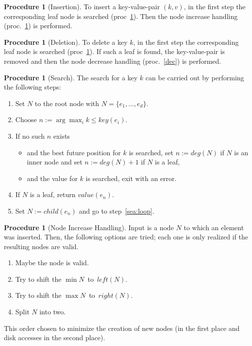 \documentclass[a4paper, 8pt]{scrartcl}
\theoremstyle{plain}
\theoremstyle{definition}
\newtheorem{proc}[thm]{Procedure}
\theoremstyle{remark}
\begin{document}
\begin{multicols}{2}
\begin{proc}[Insertion] \label{ins}
To insert a key-value-pair \mbox{$(k, v)$}, in the first step the corresponding
leaf node is searched (proc~\ref{sea}).
Then the node increase handling (proc.~\ref{inc}) is performed.
\end{proc}


\begin{proc}[Deletion] \label{del}
To delete a key $k$, in the first step the corresponding
leaf node is searched (proc~\ref{sea}).
If such a leaf is found, the key-value-pair is removed and then the node
decrease handling (proc.~\ref{dec}) is performed.
\end{proc}


\begin{proc}[Search] \label{sea}
The search for a key $k$ can be carried out by performing the following steps:
\begin{enumerate}
\item Set $N$ to the root node with \mbox{$N = \{e_1, \ldots, e_d\}$}.
\item \label{sea:loop} Choose \mbox{$n := \arg \max_{i} k \leq key(e_i)$}.
\item If no such $n$ exists
	\begin{itemize}
	\item and the best future position for $k$ is searched,
		set \mbox{$n := deg(N)$} if $N$ is an inner node and
		set \mbox{$n := deg(N) + 1$} if $N$ is a leaf,
	\item and the value for $k$ is searched, exit with an error.
	\end{itemize}
\item If $N$ is a leaf, return $value(e_n)$.
\item Set \mbox{$N := child(e_n)$} and go to step~\ref{sea:loop}.
\end{enumerate}
\end{proc}


\begin{proc}[Node Increase Handling] \label{inc}
Input is a node $N$ to which an element was inserted.
Then, the following options are tried; each one is only realized if the 
resulting nodes are valid.
\begin{enumerate}
\item Maybe the node is valid.
\item Try to shift the \mbox{$\min N$ to $left(N)$}.
\item Try to shift the \mbox{$\max N$ to $right(N)$}.
\item Split $N$ into two.
\end{enumerate}
This order chosen to minimize the creation of new nodes (in the first place and
disk accesses in the second place).


\end{proc}
\end{multicols}
\end{document}
